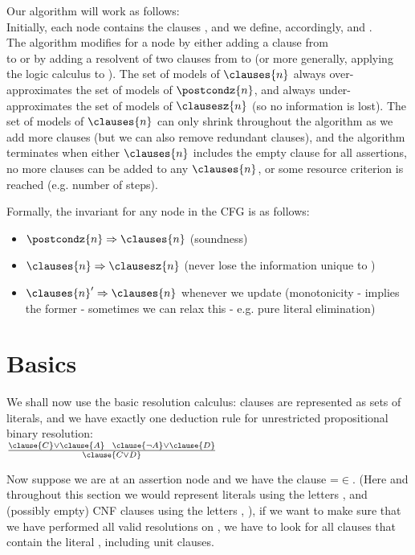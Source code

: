 Our algorithm will work as follows:\\
Initially, each node  contains the clauses , and we define, accordingly,  and .  \\
The algorithm modifies  for a node by either adding a clause from \\ 
 to  or by adding a resolvent of two clauses from  to  (or more generally, applying the logic calculus to ).
The set of models of $\clauses{n}$ always over-approximates the set of models of $\postcondz{n}$, and always under-approximates the set of models of $\clausesz{n}$ (so no information is lost).
The set of models of $\clauses{n}$ can only shrink throughout the algorithm as we add more clauses (but we can also remove redundant clauses), and the algorithm terminates when either $\clauses{n}$ includes the empty clause for all assertions, no more clauses can be added to any $\clauses{n}$, or some resource criterion is reached (e.g. number of steps).

Formally, the invariant for any node  in the CFG is as follows:
\begin{itemize}
	\item $\postcondz{n} \Rightarrow \clauses{n}$   (soundness)
	\item $\clauses{n} \Rightarrow \clausesz{n}$ (never lose the information unique to )
	\item $\clauses{n}' \Rightarrow \clauses{n}$ whenever we update  (monotonicity - implies the former - sometimes we can relax this - e.g. pure literal elimination)
\end{itemize}

\section{Basics}
We shall now use the basic resolution calculus: clauses are represented as sets of literals, and we have exactly one deduction rule for unrestricted propositional binary resolution:\\
$\frac{\clause{C}\lor\clause{A}~~\clause{\lnot A}\lor\clause{D}}{\clause{C\lor D}}$

\noindent
Now suppose we are at an assertion node  and we have the clause =$\in$.
(Here and throughout this section we would represent literals using the letters , and (possibly empty) CNF clauses using the letters , ), if we want to make sure that we have performed all valid resolutions on , we have to look for all clauses that contain the literal , including unit clauses.

